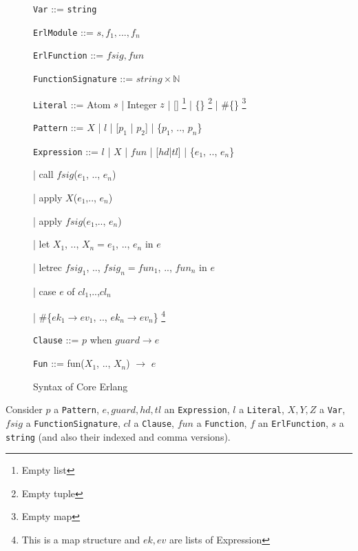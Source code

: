 \documentclass[12pt]{article}
\theoremstyle{definition}
\numberwithin{equation}{section}
\begin{document}
\begin{figure}[h]
\begin{minipage}{\textwidth}
	\verb|Var| ::= \verb|string|
	
	\verb|ErlModule| ::= $s, f_1, ..., f_n$
	
	\verb|ErlFunction| ::= $fsig, fun$
	
	\verb|FunctionSignature| ::= $string \times \mathbb{N} $
	
	\verb|Literal| ::= Atom $s$ | Integer $z$ | [] \footnote{Empty list} | \{\} \footnote{Empty tuple} | \#\{\} \footnote{Empty map}
	
	\verb|Pattern| ::= $X$ | $l$ | [$p_1$ | $p_2$] | \{$p_1$, .., $p_n$\}
	
	\verb|Expression| ::= $l$ | $X$ | $fun$ | [$hd$|$tl$] | \{$e_1$, .., $e_n$\}
	
	\hspace*{0.5cm}| call $fsig$($e_1$, .., $e_n$) 
	
	\hspace*{0.5cm}| apply $X$($e_1$,.., $e_n$) 
	
	\hspace*{0.5cm}| apply $fsig$($e_1$,.., $e_n$)
	
	\hspace*{0.5cm}| let $X_1$, .., $X_n = e_1$, .., $e_n$ in $e$
	
	\hspace*{0.5cm}| letrec $fsig_1$, .., $fsig_n = fun_1$, .., $fun_n$ in $e$
	
	\hspace*{0.5cm}| case $e$ of $cl_1$,..,$cl_n$ 
	
	\hspace*{0.5cm}| \#\{$ek_1 \rightarrow ev_1$, .., $ek_n \rightarrow ev_n$\} \footnote{This is a map structure and $ek, ev$ are lists of Expression}
	
	\verb|Clause| ::= $p$ when $guard \rightarrow e$
	
	\verb|Fun| ::= fun($X_1$, .., $X_n$) $\rightarrow$ $e$
\end{minipage}
\caption{Syntax of Core Erlang}
\label{fig:syntax}

\end{figure}


Consider $p$ a \verb|Pattern|, $e, guard, hd, tl$ an \verb|Expression|, $l$ a \verb|Literal|, $X, Y, Z$ a \verb|Var|, $fsig$ a \verb|FunctionSignature|, $cl$ a \verb|Clause|, $fun$ a \verb|Function|, $f$ an \verb|ErlFunction|, $s$ a \verb|string| (and also their indexed and comma versions).
\end{document}
